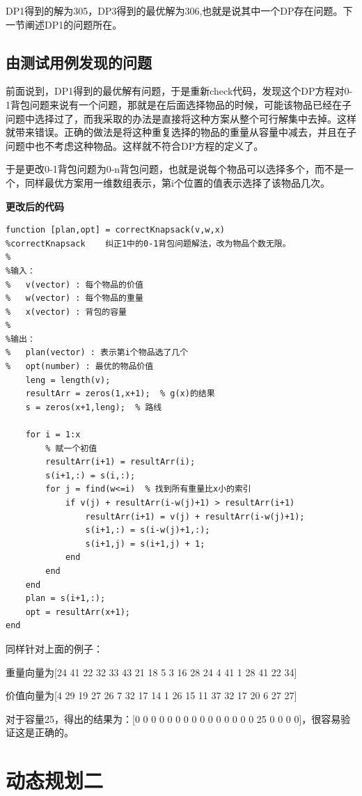 \documentclass[UTF8]{ctexart}
\begin{document}
DP1得到的解为305，DP3得到的最优解为306,也就是说其中一个DP存在问题。下一节阐述DP1的问题所在。


\subsection{由测试用例发现的问题}
前面说到，DP1得到的最优解有问题，于是重新check代码，发现这个DP方程对0-1背包问题来说有一个问题，那就是在后面选择物品的时候，可能该物品已经在子问题中选择过了，而我采取的办法是直接将这种方案从整个可行解集中去掉。这样就带来错误。正确的做法是将这种重复选择的物品的重量从容量中减去，并且在子问题中也不考虑这种物品。这样就不符合DP方程的定义了。

于是更改0-1背包问题为0-n背包问题，也就是说每个物品可以选择多个，而不是一个，同样最优方案用一维数组表示，第i个位置的值表示选择了该物品几次。

\textbf{更改后的代码}
\begin{lstlisting}
function [plan,opt] = correctKnapsack(v,w,x)
%correctKnapsack    纠正1中的0-1背包问题解法，改为物品个数无限。
%
%输入：
%   v(vector) : 每个物品的价值
%   w(vector) : 每个物品的重量
%   x(vector) : 背包的容量
%
%输出：
%   plan(vector) : 表示第i个物品选了几个
%   opt(number) : 最优的物品价值
    leng = length(v);
    resultArr = zeros(1,x+1);  % g(x)的结果
    s = zeros(x+1,leng);  % 路线
    
    for i = 1:x
        % 赋一个初值 
        resultArr(i+1) = resultArr(i);
        s(i+1,:) = s(i,:);
        for j = find(w<=i)  % 找到所有重量比x小的索引
            if v(j) + resultArr(i-w(j)+1) > resultArr(i+1)
                resultArr(i+1) = v(j) + resultArr(i-w(j)+1);
                s(i+1,:) = s(i-w(j)+1,:); 
                s(i+1,j) = s(i+1,j) + 1;
            end
        end
    end    
    plan = s(i+1,:);
    opt = resultArr(x+1);
end
\end{lstlisting}

同样针对上面的例子：

重量向量为[24    41    22    32    33    43    21    18     5     3    16    28    24     4    41     1    28    41    22    34]

价值向量为[4    29    19    27    26     7    32    17    14     1    26    15    11    37    32    17    20     6    27    27]

对于容量25，得出的结果为：[0     0     0     0     0     0     0     0     0     0     0     0     0     0     0    25     0     0     0     0]，很容易验证这是正确的。

\section{动态规划二}
\end{document}
